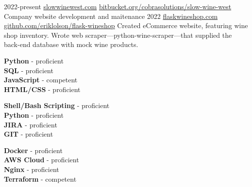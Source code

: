 \documentclass[9pt]{developercv} %
\begin{document}

\begin{entrylist}

	\entry
		{2022-present}
		{\href{https://slowwinewest.com}{slowwinewest.com}}
		{\href{https://bitbucket.org/cobrasolutions/slow-wine-west}{bitbucket.org/cobrasolutions/slow-wine-west}}
		{Company website development and maitenance}
	\entry
		{2022}
		{\href{https://flaskwineshop.com}{flaskwineshop.com}}
		{\href{https://github.com/eriklolson/flask-wineshop}{github.com/eriklolson/flask-wineshop}}
 		{Created eCommerce website, featuring wine shop inventory. Wrote web scraper—python-wine-scraper—that 
 		supplied the back-end database with mock wine products.}
		
\end{entrylist}


\begin{minipage}[t]{0.3\textwidth}
	\vspace{-\baselineskip} %

	\textbf{Python} - proficient\\
	\textbf{SQL} - proficient\\
	\textbf{JavaScript} - competent\\
	\textbf{HTML/CSS} - proficient\\
\end{minipage}
\hfill
\begin{minipage}[t]{0.3\textwidth}
	\vspace{-\baselineskip} %
	
	\textbf{Shell/Bash Scripting} - proficient\\
	\textbf{Python} - proficient\\
	\textbf{JIRA} - proficient\\
	\textbf{GIT} - proficient\\
\end{minipage}
\hfill
\begin{minipage}[t]{0.3\textwidth}
	\vspace{-\baselineskip} %
	
	\textbf{Docker} - proficient\\
	\textbf{AWS Cloud} - proficient\\
	\textbf{Nginx} - proficient\\
	\textbf{Terraform} - competent\\
\end{minipage}

\end{document}
